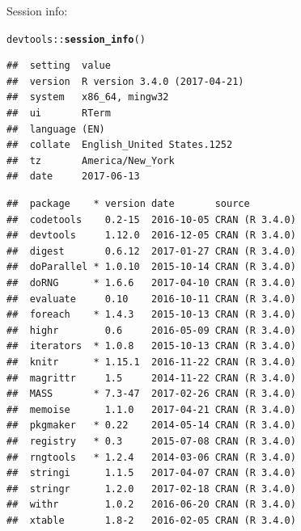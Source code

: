 \documentclass{article}\usepackage[]{graphicx}\usepackage[]{color}
\makeatletter
\newcommand{\hlopt}[1]{\textcolor[rgb]{0,0,0}{#1}}%
\newcommand{\hlstd}[1]{\textcolor[rgb]{0.345,0.345,0.345}{#1}}%
\newcommand{\hlkwd}[1]{\textcolor[rgb]{0.737,0.353,0.396}{\textbf{#1}}}%
\newenvironment{kframe}{%
 \def\at@end@of@kframe{}%
 \ifinner\ifhmode%
  \def\at@end@of@kframe{\end{minipage}}%
  \begin{minipage}{\columnwidth}%
 \fi\fi%
 \def\FrameCommand##1{\hskip\@totalleftmargin \hskip-\fboxsep
 \colorbox{shadecolor}{##1}\hskip-\fboxsep
     \hskip-\linewidth \hskip-\@totalleftmargin \hskip\columnwidth}%
 \MakeFramed {\advance\hsize-\width
   \@totalleftmargin\z@ \linewidth\hsize
   \@setminipage}}%
 {\par\unskip\endMakeFramed%
 \at@end@of@kframe}
\newenvironment{knitrout}{}{} %
\makeatother
\begin{document}
Session info:
\begin{knitrout}
\color{fgcolor}\begin{kframe}
\begin{alltt}
\hlstd{devtools}\hlopt{::}\hlkwd{session_info}\hlstd{()}
\end{alltt}


{\ttfamily\noindent\itshape\color{messagecolor}{\#\# Session info -----------------------------------------------}}\begin{verbatim}
##  setting  value                       
##  version  R version 3.4.0 (2017-04-21)
##  system   x86_64, mingw32             
##  ui       RTerm                       
##  language (EN)                        
##  collate  English_United States.1252  
##  tz       America/New_York            
##  date     2017-06-13
\end{verbatim}


{\ttfamily\noindent\itshape\color{messagecolor}{\#\# Packages ---------------------------------------------------}}\begin{verbatim}
##  package    * version date       source        
##  codetools    0.2-15  2016-10-05 CRAN (R 3.4.0)
##  devtools     1.12.0  2016-12-05 CRAN (R 3.4.0)
##  digest       0.6.12  2017-01-27 CRAN (R 3.4.0)
##  doParallel * 1.0.10  2015-10-14 CRAN (R 3.4.0)
##  doRNG      * 1.6.6   2017-04-10 CRAN (R 3.4.0)
##  evaluate     0.10    2016-10-11 CRAN (R 3.4.0)
##  foreach    * 1.4.3   2015-10-13 CRAN (R 3.4.0)
##  highr        0.6     2016-05-09 CRAN (R 3.4.0)
##  iterators  * 1.0.8   2015-10-13 CRAN (R 3.4.0)
##  knitr      * 1.15.1  2016-11-22 CRAN (R 3.4.0)
##  magrittr     1.5     2014-11-22 CRAN (R 3.4.0)
##  MASS       * 7.3-47  2017-02-26 CRAN (R 3.4.0)
##  memoise      1.1.0   2017-04-21 CRAN (R 3.4.0)
##  pkgmaker   * 0.22    2014-05-14 CRAN (R 3.4.0)
##  registry   * 0.3     2015-07-08 CRAN (R 3.4.0)
##  rngtools   * 1.2.4   2014-03-06 CRAN (R 3.4.0)
##  stringi      1.1.5   2017-04-07 CRAN (R 3.4.0)
##  stringr      1.2.0   2017-02-18 CRAN (R 3.4.0)
##  withr        1.0.2   2016-06-20 CRAN (R 3.4.0)
##  xtable       1.8-2   2016-02-05 CRAN (R 3.4.0)
\end{verbatim}
\end{kframe}
\end{knitrout}
\end{document}

